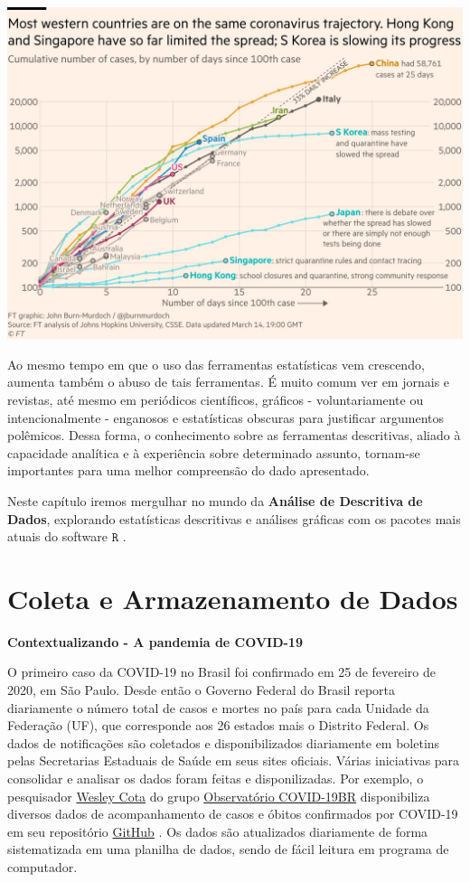 \documentclass[
]{book}
\begin{document}
\begin{center}\includegraphics{financial_times} \end{center}

Ao mesmo tempo em que o uso das ferramentas estatísticas vem crescendo, aumenta também o abuso de tais ferramentas. É muito comum ver em jornais e revistas, até mesmo em periódicos científicos, gráficos - voluntariamente ou intencionalmente - enganosos e estatísticas obscuras para justificar argumentos polêmicos. Dessa forma, o conhecimento sobre as ferramentas descritivas, aliado à capacidade analítica e à experiência sobre determinado assunto, tornam-se importantes para uma melhor compreensão do dado apresentado.

Neste capítulo iremos mergulhar no mundo da \textbf{Análise de Descritiva de Dados}, explorando estatísticas descritivas e análises gráficas com os pacotes mais atuais do software \(\texttt{R}\) \citep{R2020}.

\hypertarget{coleta-e-armazenamento-de-dados}{%
\section{Coleta e Armazenamento de Dados}\label{coleta-e-armazenamento-de-dados}}

\textbf{Contextualizando - A pandemia de COVID-19}

O primeiro caso da COVID-19 no Brasil foi confirmado em 25 de fevereiro de 2020, em São Paulo. Desde então o Governo Federal do Brasil reporta diariamente o número total de casos e mortes no país para cada Unidade da Federação (UF), que corresponde aos 26 estados mais o Distrito Federal. Os dados de notificações são coletados e disponibilizados diariamente em boletins pelas Secretarias Estaduais de Saúde em seus sites oficiais. Várias iniciativas para consolidar e analisar os dados foram feitas e disponilizadas. Por exemplo, o pesquisador \href{https://www.wesleycota.com/}{Wesley Cota} do grupo \href{https://covid19br.github.io/}{Observatório COVID-19BR} disponibiliza diversos dados de acompanhamento de casos e óbitos confirmados por COVID-19 em seu repositório \href{https://github.com/wcota/covid19br}{GitHub} \citep{CotaCovid19br2020}. Os dados são atualizados diariamente de forma sistematizada em uma planilha de dados, sendo de fácil leitura em programa de computador.
\end{document}
